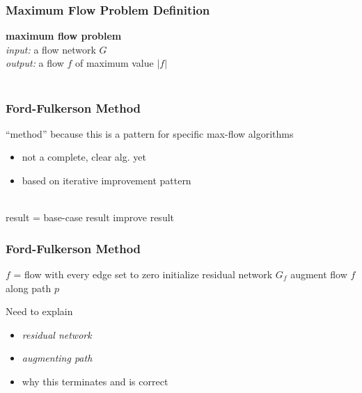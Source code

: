 \documentclass{beamer}
\newcommand{\stanza}{ \\~\ }
\begin{document}
\begin{frame} \frametitle{Maximum Flow Problem Definition}
\textbf{maximum flow problem} \\
\emph{input:} a flow network $G$ \\
\emph{output:} a flow $f$ of maximum value $|f|$ \stanza
\end{frame}

\begin{frame} \frametitle{Ford-Fulkerson Method}
``method'' because this is a pattern for specific max-flow algorithms
\begin{itemize}
  \item not a complete, clear alg. yet
  \item based on iterative improvement pattern \stanza
\end{itemize}

{\footnotesize
\begin{algorithmic}[1]
  \State result = base-case result
    \State improve result
  \EndWhile
  \State {}
  \EndFunction
\end{algorithmic}
}

\end{frame}

\begin{frame} \frametitle{Ford-Fulkerson Method}
{\footnotesize
\begin{algorithmic}[1]
  \State $f$ = flow with every edge set to zero
  \State initialize residual network $G_f$
    \State augment flow $f$ along path $p$
  \EndWhile
  \State {}
  \EndFunction
\end{algorithmic}
}
\vspace{.5cm}

Need to explain
\begin{itemize}
  \item \emph{residual network}
  \item \emph{augmenting path}
  \item why this terminates and is correct
\end{itemize}
\end{frame}
\end{document}
